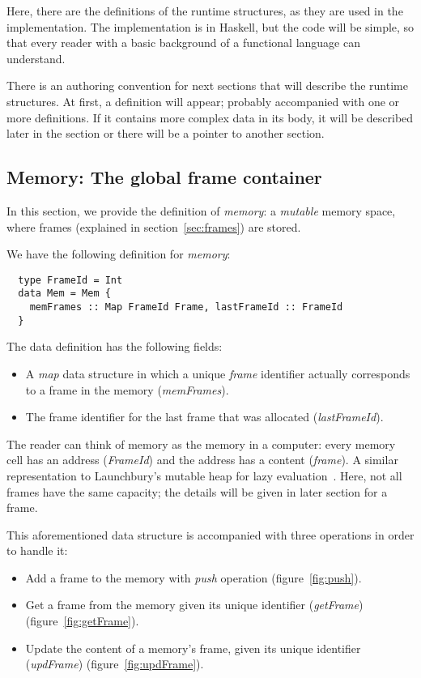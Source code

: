 \documentclass[diploma]{softlab-thesis}
\begin{document}
Here, there are the definitions of the runtime structures, as they are used in the implementation. The 
implementation is in Haskell, but the code will be simple, so that every reader with a basic background of a functional 
language can understand.
\newline
\par There is an authoring convention for next sections that will describe the runtime structures. At first, a definition 
will appear; probably accompanied with one or more definitions. If it contains more complex data in its body, it will be 
described later in the section or there will be a pointer to another section.

\subsection{Memory: The global frame container}

In this section, we provide the definition of \textit{memory}: 
a \textit{mutable} memory space, where frames (explained in section~\ref{sec:frames}) are stored.

We have the following definition for \textit{memory}:
\begin{verbatim}
  type FrameId = Int
  data Mem = Mem {
    memFrames :: Map FrameId Frame, lastFrameId :: FrameId
  }
\end{verbatim}

The data definition has the following fields:
\begin{itemize}
  \item A \textit{map} data structure in which a unique \textit{frame} identifier actually corresponds to 
  a frame in the memory (\textit{memFrames}). 
  \item The frame identifier for the last frame that was allocated (\textit{lastFrameId}).
\end{itemize}

The reader can think of memory as the memory in a computer: every memory cell has an address (\textit{FrameId}) and 
the address has a content (\textit{frame}). A similar representation to Launchbury's mutable heap for 
lazy evaluation~\cite{La93}.
Here, not all frames have the same capacity; the details will be given in later section for a frame.
\newline
\par This aforementioned data structure is accompanied with three operations in order to handle it:
\begin{itemize}
  \item Add a frame to the memory with \textit{push} operation (figure~\ref{fig:push}).
  \item Get a frame from the memory given its unique identifier (\textit{getFrame})
  (figure~\ref{fig:getFrame}).
  \item Update the content of a memory's frame, given its unique identifier (\textit{updFrame})
  (figure~\ref{fig:updFrame}).
\end{itemize}
\end{document}
